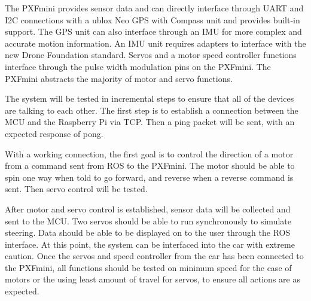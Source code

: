 \documentclass[compsoc,draftclsnofoot,onecolumn,10pt]{IEEEtran}
\begin{document}
The PXFmini provides sensor data and can directly interface through UART and I2C connections with a ublox Neo GPS with Compass unit and provides built-in support. The GPS unit can also interface through an IMU for more complex and accurate motion information. An IMU unit requires adapters to interface with the new Drone Foundation standard. 
Servos and a motor speed controller functions interface through the pulse width modulation pins on the PXFmini. The PXFmini abstracts the majority of motor and servo functions. \par

The system will be tested in incremental steps to ensure that all of the devices are talking to each other. 
The first step is to establish a connection between the MCU and the Raspberry Pi via TCP. Then a ping packet will be sent, with an expected response of pong. \par
With a working connection, the first goal is to control the direction of a motor from a command sent from ROS to the PXFmini. The motor should be able to spin one way when told to go forward, and reverse when a  reverse command is sent. Then servo control will be tested. \par
After motor and servo control is established, sensor data will be collected and sent to the MCU. Two servos should be able to run synchronously to simulate steering. Data should be able to be displayed on to the user through the ROS interface. 
At this point, the system can be interfaced into the car with extreme caution. Once the servos and speed controller from the car has been connected to the PXFmini, all functions should be tested on minimum speed for the case of motors or the using least amount of travel for servos, to ensure all actions are as expected. \par
\end{document}

